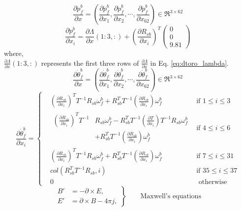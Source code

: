 \documentclass[12pt]{article}
\def\dfdx#1#2{\frac{\partial {#1}}{\partial {#2}}}
\begin{document}
 \begin{equation}
 \label{eq:dmsr_dacc}
 \dfdx{\ddot{p}_{f}^{b}}{x} = \left( \dfdx{\ddot{p}_{f}^{b}}{x_{1}},\dfdx{\ddot{p}_{f}^{b}}{x_{2}}, \cdots , \dfdx{\ddot{p}_{f}^{b}}{x_{62}} \right) \in \Re^{3 \times 62}
 \end{equation}
 $$ \dfdx{\ddot{p}_{f}^{b}}{x_{i}} = \dfdx{\Lambda}{x}(1:3,:) + \left(\dfdx{R_{sb}}{x_{i}}\right)^{T}
 \begin{pmatrix}
 0 \\ 0 \\ 9.81
 \end{pmatrix}$$
where,\\
$\dfdx{\Lambda}{x}(1:3,:)$ represents the first three rows of $\dfdx{\Lambda}{x}$ in Eq. \ref{eq:dtoro_lambda}.
\begin{equation}
\label{eq:dmsr_dtheta}
\dfdx{\dot{\theta}_{f}^{b}}{x} = \left(\dfdx{\dot{\theta}_{f}^{b}}{x_{1}}, \dfdx{\dot{\theta}_{f}^{b}}{x_{2}}, \cdots , \dfdx{\dot{\theta}_{f}^{b}}{x_{62}} \right) \in \Re^{3 \times 62}
\end{equation}
\[
\dfdx{\dot{\theta}_{f}^{b}}{x_{i}} = 
\left\{ 
\!\begin{aligned}
&\left(\dfdx{R_{sb}}{x_{i}}\right)^{T}T^{-1}R_{sb} \omega_{f}^{b}+ R_{sb} ^{T}T^{-1} \left(\dfdx{R_{sb}}{x_{i}}\right)\omega_{f}^{b} & \text{if } 1 \leq i \leq 3 \\
&\!\begin{aligned}%
	\left(\dfdx{R_{sb}}{x_{i}}\right)^{T}T^{-1} & R_{sb} \omega_{f}^{b} - R_{sb} ^{T}T^{-1} \left(\dfdx{T}{x_{i}}\right)T^{-1}R_{sb} \omega_{f}^{b} \\
	 & + R_{sb} ^{T}T^{-1} \left(\dfdx{R_{sb}}{x_{i}}\right)\omega_{f}^{b}
    \end{aligned}       & \text{if } 4 \leq i \leq 6 \\[1ex]
&\left(\dfdx{R_{sb}}{x_{i}}\right)^{T}T^{-1}R_{sb} \omega_{f}^{b}+ R_{sb} ^{T}T^{-1} \left(\dfdx{R_{sb}}{x_{i}}\right)\omega_{f}^{b} & \text{if } 7 \leq i \leq 31 \\
&col(R_{sb}^{T}T^{-1}R_{sb},i) & \text{if } 35 \leq i \leq 37 \\
&0 & \text{ otherwise} 
\end{aligned}
\right.
\]
\begin{equation*}
\left.\begin{aligned}
B'&=-\partial\times E,\\
E'&=\partial\times B - 4\pi j,
\end{aligned}
\right\}
\qquad \text{Maxwell's equations}
\end{equation*}
\end{document}
